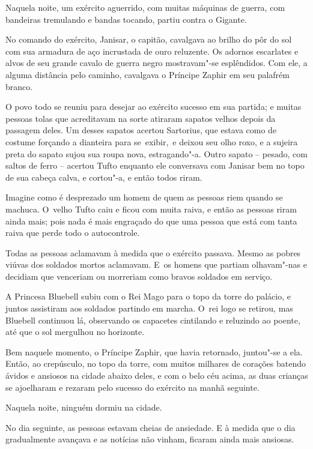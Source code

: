 Naquela noite, um exército aguerrido, com muitas máquinas de guerra, com
bandeiras tremulando e bandas tocando, partiu contra o Gigante.

No comando do exército, Janisar, o capitão, cavalgava ao brilho do pôr do sol com sua armadura de aço incrustada de ouro reluzente. Os adornos
escarlates e alvos de seu grande cavalo de guerra negro mostravam"-se
esplêndidos. Com ele, a alguma distância pelo caminho, cavalgava o
Príncipe Zaphir em seu palafrém branco.

O povo todo se reuniu para desejar ao exército sucesso em sua partida; e
muitas pessoas tolas que acreditavam na sorte atiraram sapatos velhos
depois da passagem deles. Um desses sapatos acertou Sartorius, que
estava como de costume forçando a dianteira para se~exibir,~e deixou seu
olho roxo, e a sujeira preta do sapato sujou sua roupa nova,
estragando"-a. Outro sapato -- pesado, com saltos de ferro -- acertou
Tufto enquanto ele conversava com Janisar bem no topo de sua cabeça
calva, e cortou"-a, e então todos riram.

Imagine como é desprezado um homem de quem as pessoas riem quando se
machuca. O~velho Tufto caiu e ficou com muita raiva, e então as pessoas
riram ainda mais; pois nada é mais engraçado do que uma pessoa que está
com tanta raiva que perde todo o autocontrole.

Todas as pessoas aclamavam à medida que o exército passava. Mesmo as
pobres viúvas dos soldados mortos aclamavam. E~os homens que
partiam olhavam"-nas e decidiam que venceriam ou morreriam como
bravos soldados em serviço.

A Princesa Bluebell subiu com o Rei Mago para o topo da torre do palácio,
e juntos assistiram aos soldados partindo em marcha. O~rei logo se
retirou, mas Bluebell continuou lá, observando os capacetes cintilando e
reluzindo ao poente, até que o sol mergulhou no horizonte.

Bem naquele momento, o Príncipe Zaphir, que havia retornado, juntou"-se a
ela. Então, ao crepúsculo, no topo da torre, com muitos milhares de
corações batendo ávidos e ansiosos na cidade abaixo deles, e com o belo
céu acima, as duas crianças se ajoelharam e rezaram pelo sucesso do
exército na manhã seguinte.

\smallskip
Naquela noite, ninguém dormiu na cidade.

\smallskip
No dia seguinte, as pessoas estavam cheias de ansiedade. E à medida que
o dia gradualmente avançava e as notícias não vinham, ficaram ainda
mais ansiosas.

